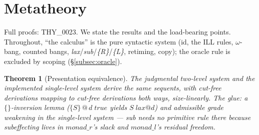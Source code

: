 \documentclass[11pt]{article}
\makeatletter
\newcommand{\lax}[2]{\{#1\}\mathbin{@}#2}       %
\newcommand{\tr}{\;\mathit{true}}                %
\newcommand{\laxjdg}[1]{\;\mathit{lax}@{#1}}    %
\newtheorem{theorem}{Theorem}[section]
\theoremstyle{definition}
\theoremstyle{remark}
\makeatother
\begin{document}
\section{Metatheory}
\label{sec:meta}

Full proofs: THY\_0023.  We state the results and the load-bearing points.
Throughout, ``the calculus'' is the pure syntactic system (id, the ILL rules,
$\omega$-bang, counted bangs, \textit{lax}/\textit{sub}/\textit{\{R\}}/\textit{\{L\}},
retiming, copy); the oracle rule is excluded by scoping
(\S\ref{subsec:oracle}).

\begin{theorem}[Presentation equivalence]
\label{thm:pres-equiv}
The judgmental two-level system and the implemented single-level system derive
the same sequents, with cut-free derivations mapping to cut-free derivations
both ways, size-linearly.  The glue: a $\{\}$-inversion lemma ($\lax{S}{d}\tr$
yields $S\laxjdg{d}$) and admissible grade weakening in the single-level system
--- \textit{sub} needs no primitive rule there because subeffecting lives in
$\mathit{monad\_r}$'s slack and $\mathit{monad\_l}$'s residual freedom.
\end{theorem}
\end{document}

